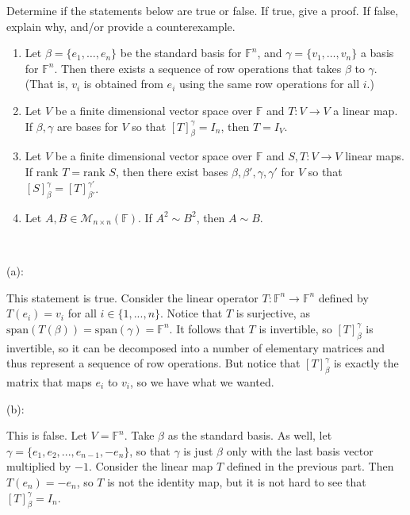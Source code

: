 \documentclass{eh-homework}
\begin{document}
    \begin{question}{13}
        Determine if the statements below are true or false. If true, give a proof. If false, explain why, and/or provide a counterexample.

        \begin{enumerate}[label=(\alph*)]
            \item Let \( \beta = \{ e_1, \ldots, e_n \} \) be the standard basis for \( \mathbb{F}^n \), and \( \gamma = \{ v_1, \ldots, v_n \} \) a basis for \( \mathbb{F}^n \). Then there exists a sequence of row operations that takes \( \beta \) to \( \gamma \). (That is, \( v_i \) is obtained from \( e_i \) using the same row operations for all \( i \).)
            \item Let \( V \) be a finite dimensional vector space over \( \mathbb{F} \) and \( T : V \to V \) a linear map. If \( \beta, \gamma \) are bases for \( V \) so that \( [T]_\beta^\gamma = I_n \), then \( T = I_V \).
            \item Let \( V \) be a finite dimensional vector space over \( \mathbb{F} \) and \( S, T : V \to V \) linear maps. If rank \( T = \text{rank } S \), then there exist bases \( \beta, \beta', \gamma, \gamma' \) for \( V \) so that \( [S]_\beta^\gamma = [T]_{\beta'}^{\gamma'}\).
            \item Let \( A, B \in \mathcal{M}_{n \times n}(\mathbb{F}) \). If \( A^2 \sim B^2 \), then \( A \sim B \).
        \end{enumerate}
        \tcblower
        \ 

        (a):

        This statement is true. Consider the linear operator \(T: \mathbb{F}^n \to \mathbb{F}^n\) defined by \(T(e_i) = v_i\) for all \(i \in \{ 1, ..., n \}\). Notice that \(T\) is surjective, as \(\mathrm{span} (T(\beta)) = \mathrm{span} (\gamma) = \mathbb{F}^n\). It follows that \(T\) is invertible, so \([T]_\beta^\gamma\) is invertible, so it can be decomposed into a number of elementary matrices and thus represent a sequence of row operations. But notice that \([T]_\beta^\gamma\) is exactly the matrix that maps \(e_i\) to \(v_i\), so we have what we wanted.

        \medskip

        (b):

        This is false. Let \(V = \mathbb{F}^n\). Take \(\beta\) as the standard basis. As well, let \(\gamma = \{ e_1, e_2, ..., e_{n-1}, -e_n\}\), so that \(\gamma\) is just \(\beta\) only with the last basis vector multiplied by \(-1\). Consider the linear map \(T\) defined in the previous part. Then \(T(e_n) = -e_n\), so \(T\) is not the identity map, but it is not hard to see that \([T]_\beta^\gamma = I_n\).


\end{question}
\end{document}
